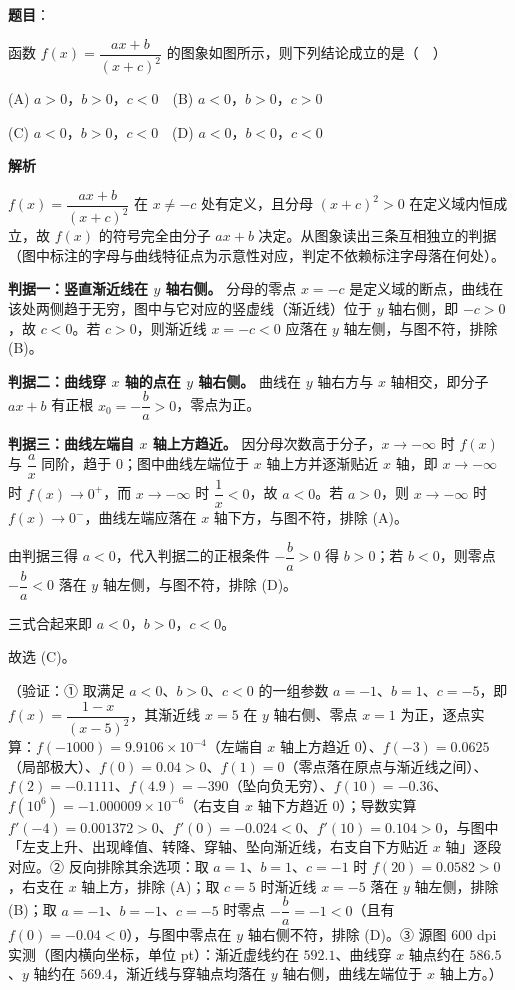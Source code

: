 \begin{answer}

\textbf{题目}：

函数 \(f(x)=\dfrac{ax+b}{(x+c)^2}\) 的图象如图所示，则下列结论成立的是（　）
\nopagebreak[4]
\begin{center}\end{center}
\nopagebreak[4]
(A) \(a>0\)，\(b>0\)，\(c<0\)　(B) \(a<0\)，\(b>0\)，\(c>0\)

(C) \(a<0\)，\(b>0\)，\(c<0\)　(D) \(a<0\)，\(b<0\)，\(c<0\)

\textbf{解析}

\(f(x)=\dfrac{ax+b}{(x+c)^{2}}\) 在 \(x\neq-c\) 处有定义，且分母 \((x+c)^{2}>0\) 在定义域内恒成立，故 \(f(x)\) 的符号完全由分子 \(ax+b\) 决定。从图象读出三条互相独立的判据（图中标注的字母与曲线特征点为示意性对应，判定不依赖标注字母落在何处）。

\textbf{判据一：竖直渐近线在 \(y\) 轴右侧。} 分母的零点 \(x=-c\) 是定义域的断点，曲线在该处两侧趋于无穷，图中与它对应的竖虚线（渐近线）位于 \(y\) 轴右侧，即 \(-c>0\)，故 \(c<0\)。若 \(c>0\)，则渐近线 \(x=-c<0\) 应落在 \(y\) 轴左侧，与图不符，排除 (B)。

\textbf{判据二：曲线穿 \(x\) 轴的点在 \(y\) 轴右侧。} 曲线在 \(y\) 轴右方与 \(x\) 轴相交，即分子 \(ax+b\) 有正根 \(x_0=-\dfrac{b}{a}>0\)，零点为正。

\textbf{判据三：曲线左端自 \(x\) 轴上方趋近。} 因分母次数高于分子，\(x\to-\infty\) 时 \(f(x)\) 与 \(\dfrac{a}{x}\) 同阶，趋于 \(0\)；图中曲线左端位于 \(x\) 轴上方并逐渐贴近 \(x\) 轴，即 \(x\to-\infty\) 时 \(f(x)\to0^{+}\)，而 \(x\to-\infty\) 时 \(\dfrac{1}{x}<0\)，故 \(a<0\)。若 \(a>0\)，则 \(x\to-\infty\) 时 \(f(x)\to0^{-}\)，曲线左端应落在 \(x\) 轴下方，与图不符，排除 (A)。

由判据三得 \(a<0\)，代入判据二的正根条件 \(-\dfrac{b}{a}>0\) 得 \(b>0\)；若 \(b<0\)，则零点 \(-\dfrac{b}{a}<0\) 落在 \(y\) 轴左侧，与图不符，排除 (D)。

三式合起来即 \(a<0\)，\(b>0\)，\(c<0\)。

故选 (C)。

（验证：① 取满足 \(a<0\)、\(b>0\)、\(c<0\) 的一组参数 \(a=-1\)、\(b=1\)、\(c=-5\)，即 \(f(x)=\dfrac{1-x}{(x-5)^{2}}\)，其渐近线 \(x=5\) 在 \(y\) 轴右侧、零点 \(x=1\) 为正，逐点实算：\(f(-1000)=9.9106\times10^{-4}\)（左端自 \(x\) 轴上方趋近 \(0\)）、\(f(-3)=0.0625\)（局部极大）、\(f(0)=0.04>0\)、\(f(1)=0\)（零点落在原点与渐近线之间）、\(f(2)=-0.1111\)、\(f(4.9)=-390\)（坠向负无穷）、\(f(10)=-0.36\)、\(f(10^{6})=-1.000009\times10^{-6}\)（右支自 \(x\) 轴下方趋近 \(0\)）；导数实算 \(f'(-4)=0.001372>0\)、\(f'(0)=-0.024<0\)、\(f'(10)=0.104>0\)，与图中「左支上升、出现峰值、转降、穿轴、坠向渐近线，右支自下方贴近 \(x\) 轴」逐段对应。② 反向排除其余选项：取 \(a=1\)、\(b=1\)、\(c=-1\) 时 \(f(20)=0.0582>0\)，右支在 \(x\) 轴上方，排除 (A)；取 \(c=5\) 时渐近线 \(x=-5\) 落在 \(y\) 轴左侧，排除 (B)；取 \(a=-1\)、\(b=-1\)、\(c=-5\) 时零点 \(-\dfrac{b}{a}=-1<0\)（且有 \(f(0)=-0.04<0\)），与图中零点在 \(y\) 轴右侧不符，排除 (D)。③ 源图 600 dpi 实测（图内横向坐标，单位 pt）：渐近虚线约在 \(592.1\)、曲线穿 \(x\) 轴点约在 \(586.5\)、\(y\) 轴约在 \(569.4\)，渐近线与穿轴点均落在 \(y\) 轴右侧，曲线左端位于 \(x\) 轴上方。）


\end{answer}
